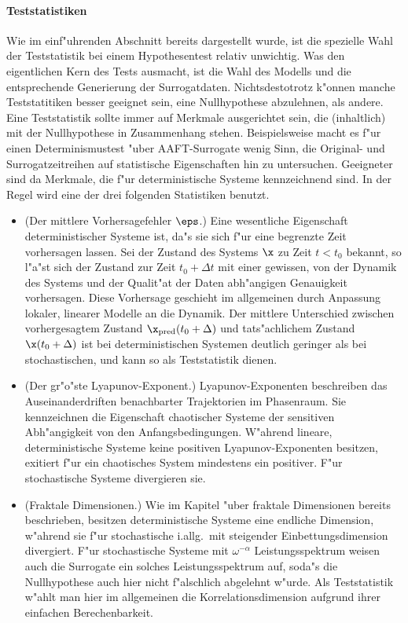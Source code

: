 \paragraph{Teststatistiken}
Wie im einf"uhrenden Abschnitt bereits dargestellt wurde, ist die spezielle Wahl der
Teststatistik bei einem Hypothesentest relativ unwichtig. Was den eigentlichen Kern des
Tests ausmacht, ist die Wahl des Modells und die entsprechende Generierung der
Surrogatdaten. Nichtsdestotrotz k"onnen manche Teststatitiken besser geeignet sein, eine
Nullhypothese abzulehnen, als andere. Eine Teststatistik sollte immer auf Merkmale
ausgerichtet sein, die \naja(inhaltlich) mit der Nullhypothese in Zusammenhang stehen.
Beispielsweise macht es f"ur einen Determinismustest "uber AAFT-Surrogate wenig Sinn, die
Original- und Surrogatzeitreihen auf statistische Eigenschaften hin zu untersuchen.
Geeigneter sind da Merkmale, die f"ur deterministische Systeme kennzeichnend sind. In der
Regel wird eine der drei folgenden Statistiken benutzt.
\begin{itemize}
\item \rem(Der mittlere Vorhersagefehler $\eps$.) Eine wesentliche Eigenschaft deterministischer 
  Systeme ist, da"s sie sich f"ur eine begrenzte Zeit vorhersagen lassen. Sei der Zustand
  des Systems $\x$ zu Zeit $t<t_0$ bekannt, so l"a"st sich der Zustand zur Zeit
  $t_0+\Delta t$ mit einer gewissen, von der Dynamik des Systems und der Qualit"at der
  Daten abh"angigen Genauigkeit vorhersagen. Diese Vorhersage geschieht im allgemeinen
  durch Anpassung lokaler, linearer Modelle an die Dynamik. Der mittlere Unterschied zwischen vorhergesagtem Zustand
  $\x_\mathrm{pred}(t_0+\Delta)$ und tats"achlichem Zustand $\x(t_0+\Delta)$ ist bei
  deterministischen Systemen deutlich geringer als bei stochastischen, und kann so als
  Teststatistik dienen. 
\item \rem(Der gr"o"ste Lyapunov-Exponent.) Lyapunov-Exponenten beschreiben das
  Auseinanderdriften benachbarter Trajektorien im Phasenraum. Sie kennzeichnen die
  Eigenschaft chaotischer Systeme der sensitiven Abh"angigkeit von den
  Anfangsbedingungen. W"ahrend lineare, deterministische Systeme keine positiven
  Lyapunov-Exponenten besitzen, exitiert f"ur ein chaotisches System mindestens ein
  positiver. F"ur stochastische Systeme divergieren sie. 
\item \rem(Fraktale Dimensionen.) Wie im Kapitel "uber fraktale Dimensionen bereits
  beschrieben, besitzen deterministische Systeme eine endliche Dimension, w"ahrend sie
  f"ur stochastische i.allg.\ mit steigender Einbettungsdimension divergiert. F"ur
  stochastische Systeme mit $\omega^{-\alpha}$ Leistungsspektrum weisen auch die Surrogate
  ein solches Leistungsspektrum auf, soda"s die Nullhypothese auch hier nicht f"alschlich
  abgelehnt w"urde. Als Teststatistik w"ahlt man hier im allgemeinen die
  Korrelationsdimension aufgrund ihrer einfachen Berechenbarkeit.
\end{itemize}
